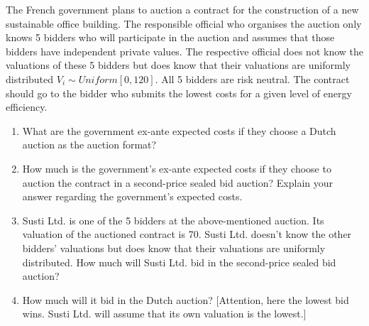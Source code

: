 \documentclass[11pt]{article} %
\begin{document}
        The French government plans to auction a contract for the construction of a new sustainable office building. The responsible official who organises the auction only knows 5 bidders who will participate in the auction and assumes that those bidders have independent private values. The respective official does not know the valuations of these 5 bidders but does know that their valuations are uniformly distributed $V_i \sim Uniform[0,120]$. All 5 bidders are risk neutral. The contract should go to the bidder who submits the lowest costs for a given level of energy efficiency.
    \begin{enumerate}
        \item What are the government ex-ante expected costs if they choose a Dutch auction as the auction format? 
        \item How much is the government's ex-ante expected costs if they choose to auction the contract in a second-price sealed bid auction? Explain your answer regarding the government's expected costs.
        \item Susti Ltd. is one of the 5 bidders at the above-mentioned auction. Its valuation of the auctioned contract is 70. Susti Ltd. doesn’t know the other bidders’ valuations but does know that their valuations are uniformly distributed. How much will Susti Ltd. bid in the second-price sealed bid auction?
	\item How much will it bid in the Dutch auction? [Attention, here the lowest bid wins. Susti Ltd. will assume that its own valuation is the lowest.]
	\end{enumerate}
	
\end{document}
